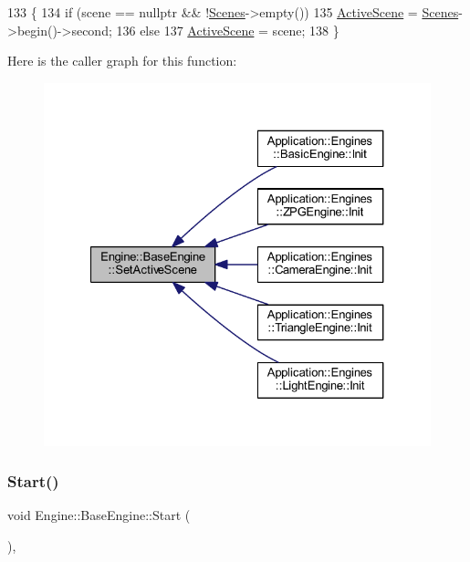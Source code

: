 \begin{DoxyCode}
133 \{
134     \textcolor{keywordflow}{if} (scene == \textcolor{keyword}{nullptr} && !\mbox{\hyperlink{classEngine_1_1BaseEngine_afd02af3c2fbe9bb734db014dec06585a}{Scenes}}->empty())
135         \mbox{\hyperlink{classEngine_1_1BaseEngine_adb3dbc839da9d821e08b18d8a221698d}{ActiveScene}} = \mbox{\hyperlink{classEngine_1_1BaseEngine_afd02af3c2fbe9bb734db014dec06585a}{Scenes}}->begin()->second;
136     \textcolor{keywordflow}{else}
137         \mbox{\hyperlink{classEngine_1_1BaseEngine_adb3dbc839da9d821e08b18d8a221698d}{ActiveScene}} = scene;     
138 \}
\end{DoxyCode}
Here is the caller graph for this function\+:
\nopagebreak
\begin{figure}[H]
\begin{center}
\leavevmode
\includegraphics[width=327pt]{classEngine_1_1BaseEngine_afc82c6a00d5a9d4714740fc5eab5db86_icgraph}
\end{center}
\end{figure}
\mbox{\label{classEngine_1_1BaseEngine_a525fdc7a1da7eecb514ad5763f06be79}} 
\subsubsection{\texorpdfstring{Start()}{Start()}}
{\footnotesize\ttfamily void Engine\+::\+Base\+Engine\+::\+Start (\begin{DoxyParamCaption}{ }\end{DoxyParamCaption})\hspace{0.3cm}{\ttfamily [virtual]}, {\ttfamily [inherited]}}



